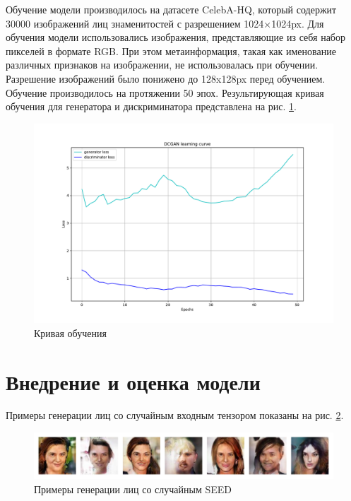 \documentclass[60x84/16,8pt]{ittmm}
\begin{document}
Обучение модели производилось на датасете CelebA-HQ,
который содержит 30000 изображений лиц знаменитостей с разрешением 1024×1024px.
Для обучения модели использовались изображения,
представляющие из себя набор пикселей в формате RGB. При этом метаинформация, такая как именование
различных признаков на изображении, не использовалась при обучении.
Разрешение изображений было понижено до 128x128px перед обучением.
Обучение производилось на протяжении 50 эпох. Результирующая кривая
обучения для генератора и дискриминатора представлена на рис. \ref{fig:learning-curve}.

\begin{figure}
  \centering
  \includegraphics[width=\linewidth]{learning_curve}
  \caption{Кривая обучения}
  \label{fig:learning-curve}
\end{figure}

\section{Внедрение и оценка модели}
\label{sec:base-section}

Примеры генерации лиц со случайным входным тензором показаны на рис. \ref{fig:result-random-seed}.

\begin{figure}
  \centering
  \includegraphics[width=\linewidth]{output}
  \caption{Примеры генерации лиц со случайным SEED}
  \label{fig:result-random-seed}
\end{figure}
\end{document}
